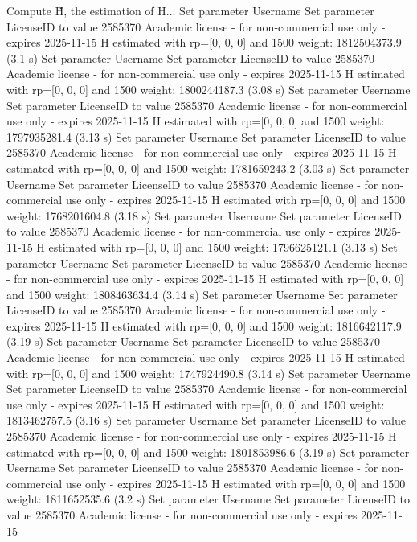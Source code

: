 Compute H̃, the estimation of H...
Set parameter Username
Set parameter LicenseID to value 2585370
Academic license - for non-commercial use only - expires 2025-11-15
  H estimated with rp=[0, 0, 0] and 1500 weight:  1812504373.9  (3.1 s)
Set parameter Username
Set parameter LicenseID to value 2585370
Academic license - for non-commercial use only - expires 2025-11-15
  H estimated with rp=[0, 0, 0] and 1500 weight:  1800244187.3  (3.08 s)
Set parameter Username
Set parameter LicenseID to value 2585370
Academic license - for non-commercial use only - expires 2025-11-15
  H estimated with rp=[0, 0, 0] and 1500 weight:  1797935281.4  (3.13 s)
Set parameter Username
Set parameter LicenseID to value 2585370
Academic license - for non-commercial use only - expires 2025-11-15
  H estimated with rp=[0, 0, 0] and 1500 weight:  1781659243.2  (3.03 s)
Set parameter Username
Set parameter LicenseID to value 2585370
Academic license - for non-commercial use only - expires 2025-11-15
  H estimated with rp=[0, 0, 0] and 1500 weight:  1768201604.8  (3.18 s)
Set parameter Username
Set parameter LicenseID to value 2585370
Academic license - for non-commercial use only - expires 2025-11-15
  H estimated with rp=[0, 0, 0] and 1500 weight:  1796625121.1  (3.13 s)
Set parameter Username
Set parameter LicenseID to value 2585370
Academic license - for non-commercial use only - expires 2025-11-15
  H estimated with rp=[0, 0, 0] and 1500 weight:  1808463634.4  (3.14 s)
Set parameter Username
Set parameter LicenseID to value 2585370
Academic license - for non-commercial use only - expires 2025-11-15
  H estimated with rp=[0, 0, 0] and 1500 weight:  1816642117.9  (3.19 s)
Set parameter Username
Set parameter LicenseID to value 2585370
Academic license - for non-commercial use only - expires 2025-11-15
  H estimated with rp=[0, 0, 0] and 1500 weight:  1747924490.8  (3.14 s)
Set parameter Username
Set parameter LicenseID to value 2585370
Academic license - for non-commercial use only - expires 2025-11-15
  H estimated with rp=[0, 0, 0] and 1500 weight:  1813462757.5  (3.16 s)
Set parameter Username
Set parameter LicenseID to value 2585370
Academic license - for non-commercial use only - expires 2025-11-15
  H estimated with rp=[0, 0, 0] and 1500 weight:  1801853986.6  (3.19 s)
Set parameter Username
Set parameter LicenseID to value 2585370
Academic license - for non-commercial use only - expires 2025-11-15
  H estimated with rp=[0, 0, 0] and 1500 weight:  1811652535.6  (3.2 s)
Set parameter Username
Set parameter LicenseID to value 2585370
Academic license - for non-commercial use only - expires 2025-11-15
